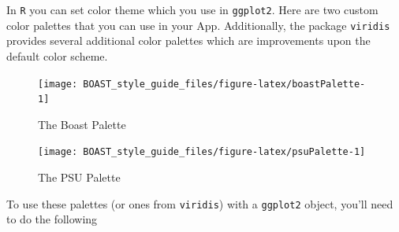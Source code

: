 \documentclass[
]{book}
\newenvironment{Shaded}{\begin{snugshade}}{\end{snugshade}}
\newcommand{\CommentTok}[1]{\textcolor[rgb]{0.56,0.35,0.01}{\textit{#1}}}
\newcommand{\KeywordTok}[1]{\textcolor[rgb]{0.13,0.29,0.53}{\textbf{#1}}}
\newcommand{\NormalTok}[1]{#1}
\newcommand{\StringTok}[1]{\textcolor[rgb]{0.31,0.60,0.02}{#1}}
\begin{document}
In \texttt{R} you can set color theme which you use in \texttt{ggplot2}. Here are two custom color palettes that you can use in your App. Additionally, the package \texttt{viridis} provides several additional color palettes which are improvements upon the default color scheme.

\begin{Shaded}
\end{Shaded}

\begin{figure}

{\centering \texttt{[image: BOAST\_style\_guide\_files/figure-latex/boastPalette-1]} 

}

\caption{The Boast Palette}\label{fig:boastPalette}
\end{figure}

\begin{figure}

{\centering \texttt{[image: BOAST\_style\_guide\_files/figure-latex/psuPalette-1]} 

}

\caption{The PSU Palette}\label{fig:psuPalette}
\end{figure}

To use these palettes (or ones from \texttt{viridis}) with a \texttt{ggplot2} object, you'll need to do the following
\end{document}
